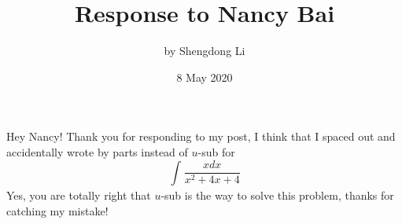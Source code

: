 \documentclass[letterpaper, 12pt]{article}
\begin{document}
\title{Response to Nancy Bai}
\author{by Shengdong Li}
\date{8 May 2020}
\maketitle

Hey Nancy! Thank you for responding to my post, I think that I spaced out and accidentally wrote by parts instead of $u$-sub for 
$$
    \int_{ }^{ }\frac{xdx}{x^{2}+4x+4}
$$
Yes, you are totally right that $u$-sub is the way to solve this problem, thanks for catching my mistake!
\end{document}
